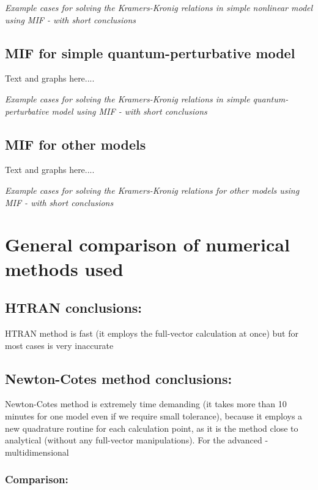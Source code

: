 \documentclass[12pt,twoside,a4paper]{article}
\numberwithin{equation}{subsection}
\numberwithin{figure}{subsection}
\begin{document}
\textit{Example cases for solving the Kramers-Kronig relations in simple nonlinear model using MIF - with short conclusions}

\subsection{MIF for simple quantum-perturbative model} \label{chap:matlab_quantum}

Text and graphs here.... 

\textit{Example cases for solving the Kramers-Kronig relations in simple quantum-perturbative model using MIF - with short
conclusions}

\subsection{MIF for other models} \label{chap:matlab_other}

Text and graphs here.... 

\textit{Example cases for solving the Kramers-Kronig relations for other models using MIF - with short conclusions}

\section{General comparison of numerical methods used} \label{chap:comparison}

\subsection*{HTRAN conclusions:} \label{chap:comparison_htran}

HTRAN method is fast (it employs the full-vector calculation at once) but for most cases is very inaccurate 

\subsection*{Newton-Cotes method conclusions:} \label{chap:comparison_nc}

Newton-Cotes method is extremely time demanding (it takes more than 10 minutes for one model even if we require small tolerance),
because it employs a new quadrature routine for each calculation point, as it is the method close to analytical (without any
full-vector manipulations). For the advanced - multidimensional

\subsubsection*{Comparison:}
\end{document}
